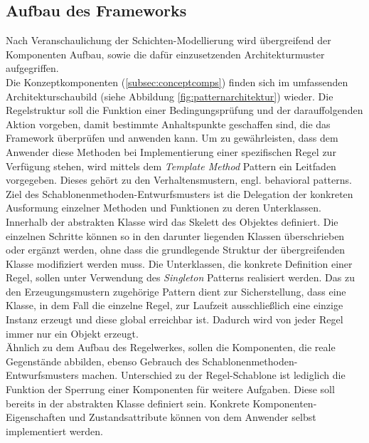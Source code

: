     \subsection{Aufbau des Frameworks}
        Nach Veranschaulichung der Schichten-Modellierung wird übergreifend der Komponenten Aufbau, sowie die dafür einzusetzenden Architekturmuster aufgegriffen. 
        \\
        Die Konzeptkomponenten (\ref{subsec:conceptcomps}) finden sich im umfassenden Architekturschaubild (siehe Abbildung \ref{fig:patternarchitektur}) wieder. 
        Die Regelstruktur 
        soll die Funktion einer Bedingungsprüfung und der darauffolgenden Aktion vorgeben, damit bestimmte Anhaltspunkte geschaffen sind, die das Framework überprüfen 
        und anwenden kann. Um zu gewährleisten, dass dem Anwender diese Methoden bei Implementierung einer spezifischen Regel zur Verfügung stehen, wird mittels dem 
        \textit{Template Method} Pattern \cite{gamma1995template} ein Leitfaden vorgegeben. Dieses gehört zu den Verhaltensmustern, engl. behavioral patterns. 
        Ziel des Schablonenmethoden-Entwurfsmusters ist die Delegation der konkreten Ausformung einzelner Methoden und Funktionen zu deren Unterklassen. Innerhalb der 
        abstrakten Klasse wird das Skelett des Objektes definiert. Die einzelnen Schritte können so in den darunter liegenden Klassen überschrieben oder ergänzt 
        werden, ohne dass die grundlegende Struktur der übergreifenden Klasse modifiziert werden muss. Die Unterklassen, die konkrete Definition einer Regel, sollen 
        unter Verwendung des \textit{Singleton} Patterns \cite{gamma1995singleton} realisiert werden. Das zu den Erzeugungsmustern 
        zugehörige Pattern dient zur 
        Sicherstellung, dass eine Klasse, in dem Fall die einzelne Regel, zur Laufzeit ausschließlich eine einzige Instanz erzeugt und diese global erreichbar ist. 
        Dadurch wird von jeder Regel immer nur ein Objekt erzeugt. 
        \\
        \linebreak
        Ähnlich zu dem Aufbau des Regelwerkes, sollen die Komponenten, die reale Gegenstände abbilden, ebenso Gebrauch des Schablonenmethoden-Entwurfsmusters machen. 
        Unterschied zu der Regel-Schablone ist lediglich die Funktion der Sperrung einer Komponenten für weitere Aufgaben. Diese soll bereits in der abstrakten Klasse 
        definiert sein. Konkrete Komponenten-Eigenschaften und Zustandsattribute können von dem Anwender selbst implementiert werden.
        \\
